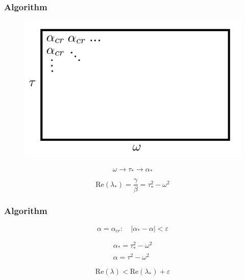\documentclass[fullscreen=true, unicode, bookmarks=false]{beamer}
\begin{document}
\begin{frame}
\frametitle{ Algorithm } 

\begin{figure} 
\includegraphics[scale=0.45]{algo.png}  
\end{figure}

$$ \omega \rightarrow \tau_{*} \rightarrow \alpha_{*} $$

$$ \mbox{Re}(\lambda_{*}) = \frac{\gamma}{\beta} = \tau_{*}^2 - \omega^2 $$ 

\end{frame}

\begin{frame}
\frametitle{ Algorithm } 

$$ \alpha = \alpha_{cr}: \quad |\alpha_{*}-\alpha| < \varepsilon $$

\pause

\begin{gather*}	
	\alpha_{*} = \tau_{*}^2 - \omega^2 \\
	\alpha = \tau^2 - \omega^2 \nonumber
\end{gather*}

\pause

$$ \mbox{Re}(\lambda) < \mbox{Re}(\lambda_{*}) + \varepsilon $$

\end{frame}
\end{document}
